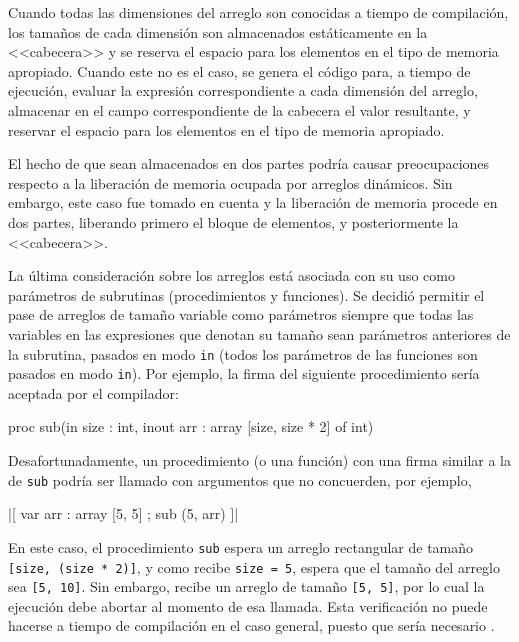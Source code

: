 Cuando todas las dimensiones del arreglo son conocidas a tiempo de compilación,
los tamaños de cada dimensión son almacenados estáticamente en la <<cabecera>> y
se reserva el espacio para los elementos en el tipo de memoria apropiado. Cuando
este no es el caso, se genera el código para, a tiempo de ejecución, evaluar la
expresión correspondiente a cada dimensión del arreglo, almacenar en el campo
correspondiente de la cabecera el valor resultante, y reservar el espacio para
los elementos en el tipo de memoria apropiado.

El hecho de que sean almacenados en dos partes podría causar preocupaciones
respecto a la liberación de memoria ocupada por arreglos dinámicos. Sin embargo,
este caso fue tomado en cuenta y la liberación de memoria procede en dos partes,
liberando primero el bloque de elementos, y posteriormente la <<cabecera>>.

La última consideración sobre los arreglos está asociada con su uso como
parámetros de subrutinas (procedimientos y funciones). Se decidió permitir el
pase de arreglos de tamaño variable como parámetros siempre que todas las
variables en las expresiones que denotan su tamaño sean parámetros anteriores de
la subrutina, pasados en modo \texttt{in} (todos los parámetros de las funciones
son pasados en modo \texttt{in}). Por ejemplo, la firma del siguiente
procedimiento sería aceptada por el compilador:

\begin{gracielacode}
  proc sub(in size : int, inout arr : array [size, size * 2] of int)
\end{gracielacode}

Desafortunadamente, un procedimiento (o una función) con una firma similar a la
de \texttt{sub} podría ser llamado con argumentos que no concuerden, por
ejemplo,

\begin{gracielacode}
  |[ var arr : array [5, 5]
  ;  sub (5, arr)
  ]|
\end{gracielacode}

En este caso, el procedimiento \texttt{sub} espera un arreglo rectangular de
tamaño \texttt{[size, (size * 2)]}, y como recibe \texttt{size = 5}, espera que
el tamaño del arreglo sea \texttt{[5, 10]}. Sin embargo, recibe un arreglo de
tamaño \texttt{[5, 5]}, por lo cual la ejecución debe abortar al momento de esa
llamada. Esta verificación no puede hacerse a tiempo de compilación en el caso
general, puesto que sería necesario .

